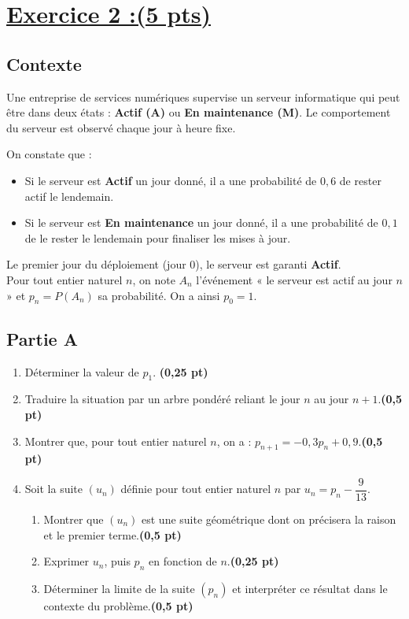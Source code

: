 \documentclass[12pt,a4paper]{article}
\begin{document}
\section*{\underline{Exercice 2 :(5 pts)} }

\subsection*{Contexte}
Une entreprise de services numériques supervise un serveur informatique qui peut être dans deux états : \textbf{Actif (A)} ou \textbf{En maintenance (M)}.
Le comportement du serveur est observé chaque jour à heure fixe. 

On constate que :
\begin{itemize}
    \item Si le serveur est \textbf{Actif} un jour donné, il a une probabilité de $0,6$ de rester actif le lendemain.
    \item Si le serveur est \textbf{En maintenance} un jour donné, il a une probabilité de $0,1$ de le rester le lendemain pour finaliser les mises à jour.
\end{itemize}

Le premier jour du déploiement (jour 0), le serveur est garanti \textbf{Actif}.\\
Pour tout entier naturel $n$, on note $A_n$ l'événement « le serveur est actif au jour $n$ » et $p_n = P(A_n)$ sa probabilité. On a ainsi $p_0 = 1$.

\subsection*{Partie A }
\begin{enumerate}
    \item Déterminer la valeur de $p_1$. \hfill \textbf{(0,25 pt)}
    \item Traduire la situation par un arbre pondéré reliant le jour $n$ au jour $n+1$.\hfill \textbf{(0,5 pt)}
    \item Montrer que, pour tout entier naturel $n$, on a : $p_{n+1} = -0,3p_n + 0,9$.\hfill \textbf{(0,5 pt)}
    \item Soit la suite $\left(u_n\right)$ définie pour tout entier naturel $n$ par $u_n = p_n - \dfrac{9}{13}$.
    \begin{enumerate}
        \item Montrer que $\left(u_n\right)$ est une suite géométrique dont on précisera la raison et le premier terme.\hfill \textbf{(0,5 pt)}
        \item Exprimer $u_n$, puis $p_n$ en fonction de $n$.\hfill \textbf{(0,25 pt)}
        \item Déterminer la limite de la suite $\left(p_n\right)$ et interpréter ce résultat dans le contexte du problème.\hfill \textbf{(0,5 pt)}
    \end{enumerate}
\end{enumerate}
\end{document}
